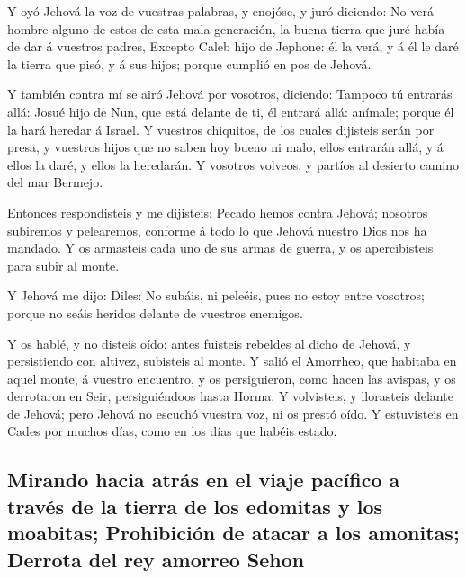  Y oyó Jehová la voz de vuestras palabras, y enojóse, y
juró diciendo:  No verá hombre alguno de estos de esta
mala generación, la buena tierra que juré había de dar á vuestros
padres,  Excepto Caleb hijo de Jephone: él la verá, y á
él le daré la tierra que pisó, y á sus hijos; porque cumplió en pos de
Jehová.

 Y también contra mí se airó Jehová por vosotros,
diciendo: Tampoco tú entrarás allá:  Josué hijo de Nun,
que está delante de ti, él entrará allá: anímale; porque él la hará
heredar á Israel.  Y vuestros chiquitos, de los cuales
dijisteis serán por presa, y vuestros hijos que no saben hoy bueno ni
malo, ellos entrarán allá, y á ellos la daré, y ellos la heredarán.
 Y vosotros volveos, y partíos al desierto camino del mar
Bermejo.

 Entonces respondisteis y me dijisteis: Pecado hemos
contra Jehová; nosotros subiremos y pelearemos, conforme á todo lo que
Jehová nuestro Dios nos ha mandado. Y os armasteis cada uno de sus armas
de guerra, y os apercibisteis para subir al monte.

 Y Jehová me dijo: Diles: No subáis, ni peleéis, pues no
estoy entre vosotros; porque no seáis heridos delante de vuestros
enemigos.

 Y os hablé, y no disteis oído; antes fuisteis rebeldes
al dicho de Jehová, y persistiendo con altivez, subisteis al monte.
 Y salió el Amorrheo, que habitaba en aquel monte, á
vuestro encuentro, y os persiguieron, como hacen las avispas, y os
derrotaron en Seir, persiguiéndoos hasta Horma.  Y
volvisteis, y llorasteis delante de Jehová; pero Jehová no escuchó
vuestra voz, ni os prestó oído.  Y estuvisteis en Cades
por muchos días, como en los días que habéis estado.

\hypertarget{mirando-hacia-atruxe1s-en-el-viaje-pacuxedfico-a-travuxe9s-de-la-tierra-de-los-edomitas-y-los-moabitas-prohibiciuxf3n-de-atacar-a-los-amonitas-derrota-del-rey-amorreo-sehon}{%
\subsection{Mirando hacia atrás en el viaje pacífico a través de la
tierra de los edomitas y los moabitas; Prohibición de atacar a los
amonitas; Derrota del rey amorreo
Sehon}\label{mirando-hacia-atruxe1s-en-el-viaje-pacuxedfico-a-travuxe9s-de-la-tierra-de-los-edomitas-y-los-moabitas-prohibiciuxf3n-de-atacar-a-los-amonitas-derrota-del-rey-amorreo-sehon}}

